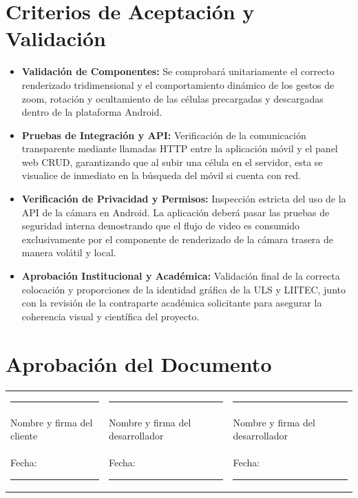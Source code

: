 \documentclass[11pt,a4paper]{article}
\begin{document}
\section{Criterios de Aceptación y Validación}
\begin{itemize}
    \item \textbf{Validación de Componentes:} Se comprobará unitariamente el correcto renderizado tridimensional y el comportamiento dinámico de los gestos de zoom, rotación y ocultamiento de las células precargadas y descargadas dentro de la plataforma Android.
    \item \textbf{Pruebas de Integración y API:} Verificación de la comunicación transparente mediante llamadas HTTP entre la aplicación móvil y el panel web CRUD, garantizando que al subir una célula en el servidor, esta se visualice de inmediato en la búsqueda del móvil si cuenta con red.
    \item \textbf{Verificación de Privacidad y Permisos:} Inspección estricta del uso de la API de la cámara en Android. La aplicación deberá pasar las pruebas de seguridad interna demostrando que el flujo de video es consumido exclusivamente por el componente de renderizado de la cámara trasera de manera volátil y local.
    \item \textbf{Aprobación Institucional y Académica:} Validación final de la correcta colocación y proporciones de la identidad gráfica de la ULS y LIITEC, junto con la revisión de la contraparte académica solicitante para asegurar la coherencia visual y científica del proyecto. 
\end{itemize}

\section{Aprobación del Documento}

\vspace{15mm}

\begin{tabularx}{\textwidth}{Y Y Y}
    \rule{4.2cm}{0.4pt} &
    \rule{4.2cm}{0.4pt} &
    \rule{4.2cm}{0.4pt} \\

    Nombre y firma del cliente &
    Nombre y firma del desarrollador  &
    Nombre y firma del desarrollador  \\[5mm]

    Fecha: \rule{2.2cm}{0.4pt} &
    Fecha: \rule{2.2cm}{0.4pt} &
    Fecha: \rule{2.2cm}{0.4pt}
\end{tabularx}
\end{document}
